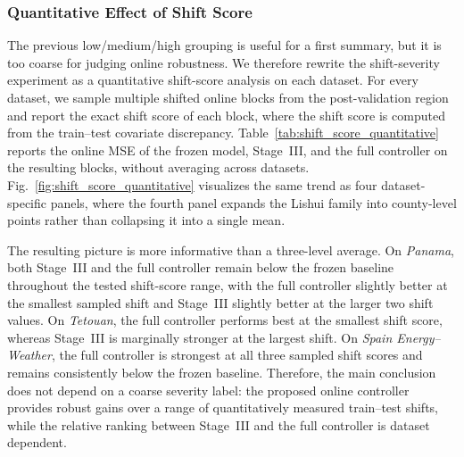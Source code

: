 ﻿\documentclass[journal]{IEEEtran}
\begin{document}
\subsubsection{Quantitative Effect of Shift Score}
The previous low/medium/high grouping is useful for a first summary, but it is too coarse for judging online robustness. We therefore rewrite the shift-severity experiment as a quantitative shift-score analysis on each dataset. For every dataset, we sample multiple shifted online blocks from the post-validation region and report the exact shift score of each block, where the shift score is computed from the train--test covariate discrepancy. Table~\ref{tab:shift_score_quantitative} reports the online MSE of the frozen model, Stage~III, and the full controller on the resulting blocks, without averaging across datasets. Fig.~\ref{fig:shift_score_quantitative} visualizes the same trend as four dataset-specific panels, where the fourth panel expands the Lishui family into county-level points rather than collapsing it into a single mean.

The resulting picture is more informative than a three-level average. On \textit{Panama}, both Stage~III and the full controller remain below the frozen baseline throughout the tested shift-score range, with the full controller slightly better at the smallest sampled shift and Stage~III slightly better at the larger two shift values. On \textit{Tetouan}, the full controller performs best at the smallest shift score, whereas Stage~III is marginally stronger at the largest shift. On \textit{Spain Energy--Weather}, the full controller is strongest at all three sampled shift scores and remains consistently below the frozen baseline. Therefore, the main conclusion does not depend on a coarse severity label: the proposed online controller provides robust gains over a range of quantitatively measured train--test shifts, while the relative ranking between Stage~III and the full controller is dataset dependent.
\end{document}
